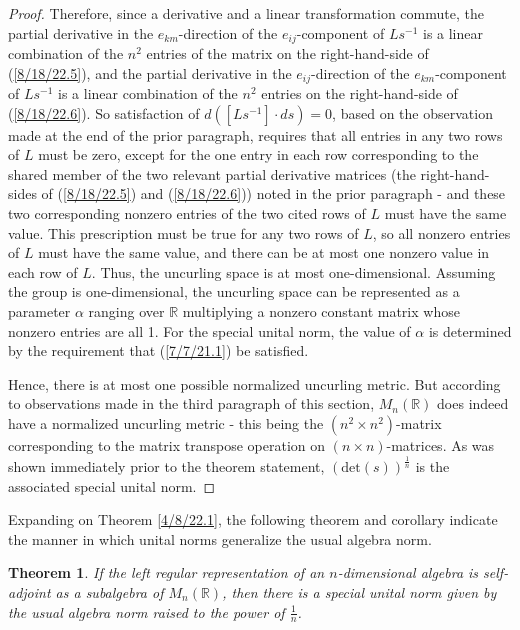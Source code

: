 \documentclass{amsart}
\numberwithin{equation}{section}
\newtheorem{theorem}{Theorem}
\theoremstyle{definition}
\numberwithin{theorem}{section}
\begin{document}
\begin{proof}
Therefore, since a derivative and a linear transformation commute, the partial derivative in the $e_{km}$-direction of the $e_{ij}$-component of $Ls^{-1}$ is a linear combination of the $n^2$ entries of the matrix on the right-hand-side of (\ref{8/18/22.5}), and  the partial derivative in the $e_{ij}$-direction of the $e_{km}$-component of $Ls^{-1}$ is a linear combination of the $n^2$ entries on the right-hand-side of (\ref{8/18/22.6}).
So satisfaction of \mbox{$d\left([Ls^{-1}]\cdot ds\right) = 0$,} based on the observation made at the end of the prior paragraph, requires that all entries in any two rows of $L$ must be zero, except for the one entry in each row corresponding to the shared member of the two relevant partial derivative matrices (the right-hand-sides of (\ref{8/18/22.5}) and (\ref{8/18/22.6})) noted in the prior paragraph - and these two corresponding nonzero entries of the two cited rows of $L$ must have the same value.  This prescription must be true for any two rows of $L$, so all nonzero entries of $L$ must have the same value, and there can be at most one nonzero value in each row of $L$.  Thus, the uncurling space is at most one-dimensional. Assuming the group is one-dimensional, the uncurling space can be represented as a parameter $\alpha$ ranging over $\mathbb{R}$ multiplying a nonzero constant matrix whose nonzero entries are all 1.  
For the special unital norm, the value of $\alpha$ is determined by the requirement that (\ref{7/7/21.1}) be satisfied. 


Hence, there is at most one possible normalized uncurling metric.  But according to observations made in the third paragraph of this section, $ M_n(\mathbb{R})$ does indeed have a normalized uncurling metric - this being the $(n^2\times n^2)$-matrix corresponding to the matrix transpose operation on $(n\times n)$-matrices.  As was shown immediately prior to the theorem statement, $(\mbox{det}(s))^{\frac{1}{n}}$ is the associated special unital norm.  
 \end{proof}
 
 Expanding on Theorem \ref{4/8/22.1}, the following theorem and corollary indicate the manner in which unital norms generalize the usual algebra norm. 
 
  \begin{theorem}\label{5/13/22.1} If the left regular representation of an $n$-dimensional algebra is self-adjoint as a subalgebra of $M_n(\mathbb{R})$, then there is a special unital norm given by the usual algebra norm raised to the power of $\frac{1}{n}$.
\end{theorem}
\end{document}
